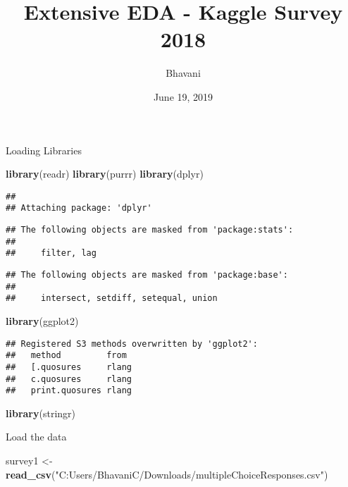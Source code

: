 \documentclass[]{article}
\title{Extensive EDA - Kaggle Survey 2018}
\author{Bhavani}
\date{June 19, 2019}
\newenvironment{Shaded}{\begin{snugshade}}{\end{snugshade}}
\newcommand{\KeywordTok}[1]{\textcolor[rgb]{0.13,0.29,0.53}{\textbf{{#1}}}}
\newcommand{\StringTok}[1]{\textcolor[rgb]{0.31,0.60,0.02}{{#1}}}
\newcommand{\NormalTok}[1]{{#1}}
\begin{document}
\maketitle

Loading Libraries

\begin{Shaded}
\begin{Highlighting}[]
\KeywordTok{library}\NormalTok{(readr)}
\KeywordTok{library}\NormalTok{(purrr)}
\KeywordTok{library}\NormalTok{(dplyr)}
\end{Highlighting}
\end{Shaded}

\begin{verbatim}
## 
## Attaching package: 'dplyr'
\end{verbatim}

\begin{verbatim}
## The following objects are masked from 'package:stats':
## 
##     filter, lag
\end{verbatim}

\begin{verbatim}
## The following objects are masked from 'package:base':
## 
##     intersect, setdiff, setequal, union
\end{verbatim}

\begin{Shaded}
\begin{Highlighting}[]
\KeywordTok{library}\NormalTok{(ggplot2)}
\end{Highlighting}
\end{Shaded}

\begin{verbatim}
## Registered S3 methods overwritten by 'ggplot2':
##   method         from 
##   [.quosures     rlang
##   c.quosures     rlang
##   print.quosures rlang
\end{verbatim}

\begin{Shaded}
\begin{Highlighting}[]
\KeywordTok{library}\NormalTok{(stringr)}
\end{Highlighting}
\end{Shaded}

Load the data

\begin{Shaded}
\begin{Highlighting}[]
\NormalTok{survey1 <-}\StringTok{ }\KeywordTok{read_csv}\NormalTok{(}\StringTok{"C:Users/BhavaniC/Downloads/multipleChoiceResponses.csv"}\NormalTok{)}
\end{Highlighting}
\end{Shaded}
\end{document}

